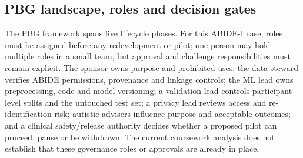 \documentclass[11pt,a4paper]{article}
\begin{document}
\subsection{PBG landscape, roles and decision gates}
The PBG framework spans five lifecycle phases. For this ABIDE-I case, roles must be assigned before any redevelopment or pilot; one person may hold multiple roles in a small team, but approval and challenge responsibilities must remain explicit. The sponsor owns purpose and prohibited uses; the data steward verifies ABIDE permissions, provenance and linkage controls; the ML lead owns preprocessing, code and model versioning; a validation lead controls participant-level splits and the untouched test set; a privacy lead reviews access and re-identification risk; autistic advisers influence purpose and acceptable outcomes; and a clinical safety/release authority decides whether a proposed pilot can proceed, pause or be withdrawn. The current coursework analysis does not establish that these governance roles or approvals are already in place.
\end{document}
